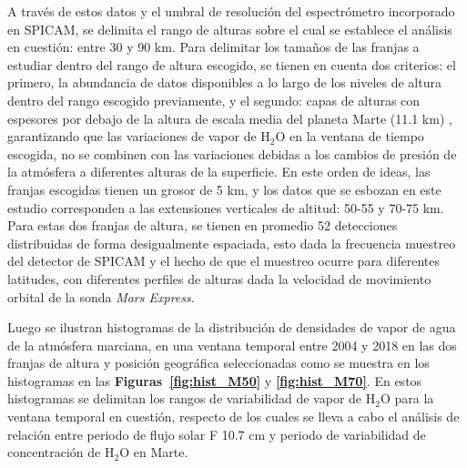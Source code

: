 \documentclass[a4paper,alpha-refs]{eSpectra}
\begin{document}
A trav\'es de estos datos y el umbral de resoluci\'on del espectr\'ometro incorporado en SPICAM, se delimita el rango de alturas sobre el cual se establece el an\'alisis en cuesti\'on: entre 30 y 90 km. Para delimitar los tama\~nos de las franjas a estudiar dentro del rango de altura escogido, se tienen en cuenta dos criterios: el primero, la abundancia de datos disponibles a lo largo de los niveles de altura dentro del rango escogido previamente, y el segundo: capas de alturas con espesores por debajo de la altura de escala media del planeta Marte (11.1 km) \citep{Mars_sheet} , garantizando que las variaciones de vapor de H$_2$O en la ventana de tiempo escogida, no se combinen con las variaciones debidas a los cambios de presi\'on de la atm\'osfera a diferentes alturas de la superficie. En este orden de ideas, las franjas escogidas tienen un grosor de 5 km, y los datos que se esbozan en este estudio corresponden a las extensiones verticales de altitud: 50-55 y 70-75 km. Para estas dos franjas de altura, se tienen en promedio 52 detecciones distribuidas de forma desigualmente espaciada, esto dada la frecuencia muestreo del detector de SPICAM y el hecho de que el muestreo ocurre para diferentes latitudes, con diferentes perfiles de alturas dada la velocidad de movimiento orbital de la sonda \textit{Mars Express}. 

Luego se ilustran histogramas de la distribuci\'on de densidades de vapor de agua de la atm\'osfera marciana, en una ventana temporal entre 2004 y 2018 en las dos franjas de altura y posici\'on geogr\'afica seleccionadas como se muestra en los histogramas en las \textbf{Figuras~\ref{fig:hist_M50}} y \textbf{\ref{fig:hist_M70}}. En estos histogramas se delimitan los rangos de variabilidad de vapor de H$_2$O para la ventana temporal en cuesti\'on, respecto de los cuales se lleva a cabo el an\'alisis de relación entre periodo de flujo solar F 10.7 cm y periodo de variabilidad de concentración de H$_2$O en Marte.
\end{document}
